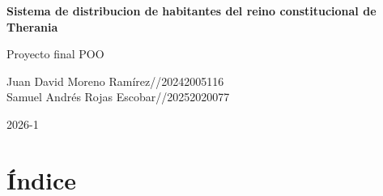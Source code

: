 \documentclass[man]{apa7}
\author{Juan David Moreno Ramirez//20242005116\\Samuel Rojas//}
\begin{document}
	
	\begin{titlepage} %
		
		\centering
		\vspace*{\fill}
		{\Huge\bfseries Sistema  de distribucion de habitantes del reino constitucional de Therania\par}%
		\vspace*{1cm}
		{\Large Proyecto final POO\par}%
		\vspace*{5cm}
		{\Large Juan David Moreno Ramírez//20242005116\\Samuel Andrés Rojas Escobar//20252020077\par}%
		\vspace*{6cm}
		{\Large 2026-1 \par}%
		\vspace*{\fill}
		
	\end{titlepage}
	
	\justifying
	
	\newpage
	
	\vspace*{\fill} 
	
	\begin{center}
	\end{center}
	
	\vspace*{\fill} 
	
	\newpage
	
	\section{Índice} \label{sec:Índice}
	
	\vspace*{\fill}
	
\end{document}
